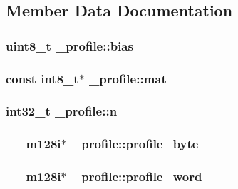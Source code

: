 \subsection{Member Data Documentation}
\hypertarget{struct__profile_ad24c78ed42ad7f63b2bb378a31b9e997}{
\subsubsection[{bias}]{\setlength{\rightskip}{0pt plus 5cm}uint8\-\_\-t \-\_\-profile\-::bias}}\label{struct__profile_ad24c78ed42ad7f63b2bb378a31b9e997}
\hypertarget{struct__profile_a6d59f3d410fee0856d081108d25571e0}{
\subsubsection[{mat}]{\setlength{\rightskip}{0pt plus 5cm}const int8\-\_\-t$\ast$ \-\_\-profile\-::mat}}\label{struct__profile_a6d59f3d410fee0856d081108d25571e0}
\hypertarget{struct__profile_a369ec73dd1f3b1da33ff85edd665f8e1}{
\subsubsection[{n}]{\setlength{\rightskip}{0pt plus 5cm}int32\-\_\-t \-\_\-profile\-::n}}\label{struct__profile_a369ec73dd1f3b1da33ff85edd665f8e1}
\hypertarget{struct__profile_afd850a1da5fbc85c9fd0b1382608f248}{
\subsubsection[{profile\-\_\-byte}]{\setlength{\rightskip}{0pt plus 5cm}\-\_\-\-\_\-m128i$\ast$ \-\_\-profile\-::profile\-\_\-byte}}\label{struct__profile_afd850a1da5fbc85c9fd0b1382608f248}
\hypertarget{struct__profile_aedd79e623e88be9188b5c05fcfd8978d}{
\subsubsection[{profile\-\_\-word}]{\setlength{\rightskip}{0pt plus 5cm}\-\_\-\-\_\-m128i$\ast$ \-\_\-profile\-::profile\-\_\-word}}\label{struct__profile_aedd79e623e88be9188b5c05fcfd8978d}
